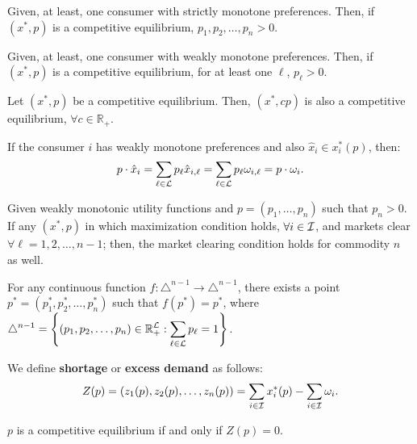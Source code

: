 \documentclass[8pt,a4paper]{extarticle}
\begin{document}
\begin{multicols}{3}
\begin{boxprop}
	Given, at least, one consumer with strictly monotone preferences. Then, if $(x^*, p)$ is a competitive equilibrium, $p_1, p_2, \ldots, p_n > 0$.
\end{boxprop}

\newpage

\begin{boxprop}
	Given, at least, one consumer with weakly monotone preferences. Then, if $(x^*, p)$ is a competitive equilibrium, for at least one $\ell$, $p_\ell > 0$.
\end{boxprop}

\begin{boxprop}
	Let $(x^*, p)$ be a competitive equilibrium. Then, $(x^*, cp)$ is also a competitive equilibrium, $\forall c \in \mathbb{R}_+$.
\end{boxprop}

\begin{boxtheo}
	If the consumer $i$ has weakly monotone preferences and also $\hat{x}_i \in x^*_i (p)$, then:
	\[
		p \cdot \hat{x}_i = \sum_{\ell \in \mathcal{L}} p_\ell \hat{x}_{i, \ell} = \sum_{\ell \in \mathcal{L}} p_\ell \omega_{i, \ell} = p \cdot \omega_i
	.\] 
\end{boxtheo}

\begin{boxcor}
	Given weakly monotonic utility functions and $p = (p_1, \ldots, p_n)$ such that $p_n > 0$. If any $(x^*, p)$ in which maximization condition holds, $\forall i \in \mathcal{I}$, and markets clear $\forall \ell = 1, 2, \ldots, n - 1$; then, the market clearing condition holds for commodity $n$ as well.
\end{boxcor}

\begin{boxtheo}
	For any continuous function $f : \triangle^{n - 1} \to \triangle^{n - 1}$, there exists a point $p^* = (p^*_1, p^*_2, \ldots, p^*_n)$ such that $f(p^*) = p^*$, where $\displaystyle \triangle^{n - 1} = \left\{(p_1, p_2, \ldots, p_n) \in \mathbb{R}_+^{\mathcal{L}} : \sum_{\ell \in \mathcal{L}} p_\ell = 1 \right\}$.
\end{boxtheo}

\begin{boxdef}[Shortage]
	We define \textbf{shortage} or \textbf{excess demand} as follows:
	\[
		Z(p) = (z_1(p), z_2(p), \ldots, z_n(p)) = \sum_{i \in \mathcal{I}} x^*_i(p) - \sum_{i \in \mathcal{I}} \omega_i
	.\] 
\end{boxdef}

\begin{boxprop}
	$p$ is a competitive equilibrium if and only if $Z(p) = 0$.
\end{boxprop}


\end{multicols}
\end{document}
